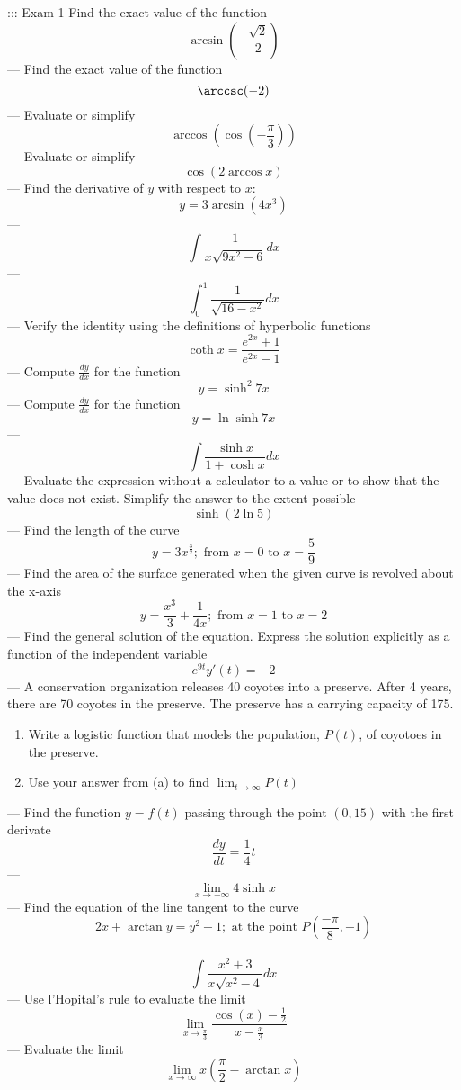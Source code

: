 ::: Exam 1
Find the exact value of the function
\[\arcsin\left(-\frac{\sqrt{2}}{2}\right)\]
---
Find the exact value of the function
\[\arccsc(-2)\]
---
Evaluate or simplify
\[\arccos\left(\cos\left(-\frac{\pi}{3}\right)\right)\]
---
Evaluate or simplify
\[\cos(2\arccos x)\]
---
Find the derivative of \(y\) with respect to \(x\):
\[y=3\arcsin(4x^3)\]
---
\[\int\frac{1}{x\sqrt{9x^2-6}}dx\]
---
\[\int_0^1\frac{1}{\sqrt{16-x^2}}dx\]
---
Verify the identity using the definitions of hyperbolic functions
\[\coth x=\frac{e^{2x}+1}{e^{2x}-1}\]
---
Compute \(\frac{dy}{dx}\) for the function
\[y=\sinh^2 7x\]
---
Compute \(\frac{dy}{dx}\) for the function
\[y=\ln\sinh 7x\]
---
\[\int\frac{\sinh x}{1+\cosh x}dx\]
---
Evaluate the expression without a calculator to a value or to show that the value does not exist. Simplify the answer to the extent possible
\[\sinh(2\ln 5)\]
---
Find the length of the curve
\[y=3x^{\frac{3}{2}};\text{ from }x=0\text{ to }x=\frac{5}{9}\]
---
Find the area of the surface generated when the given curve is revolved about the x-axis
\[y=\frac{x^3}{3}+\frac{1}{4x};\text{ from }x=1\text{ to }x=2\]
---
Find the general solution of the equation. Express the solution explicitly as a function of the independent variable
\[e^{9t}y'(t)=-2\]
---
A conservation organization releases 40 coyotes into a preserve. After 4 years, there are 70 coyotes in the preserve. The preserve has a carrying capacity of 175.
\begin{enumerate}
\item Write a logistic function that models the population, \(P(t)\), of coyotoes in the preserve.
\item Use your answer from (a) to find \(\displaystyle\lim_{t\to\infty}P(t)\)
\end{enumerate}
---
Find the function \(y=f(t)\) passing through the point \((0,15)\) with the first derivate
\[\frac{dy}{dt}=\frac{1}{4}t\]
---
\[\lim_{x\to-\infty}4\sinh x\]
---
Find the equation of the line tangent to the curve
\[2x+\arctan y=y^2-1;\text{ at the point }P(\frac{-\pi}{8},-1)\]
---
\[\int\frac{x^2+3}{x\sqrt{x^2-4}}dx\]
---
Use l'Hopital's rule to evaluate the limit
\[\lim_{x\to\frac{\pi}{3}}\frac{\cos(x)-\frac{1}{2}}{x-\frac{x}{3}}\]
---
Evaluate the limit
\[\lim_{x\to\infty}x\left(\frac{\pi}{2}-\arctan x\right)\]
